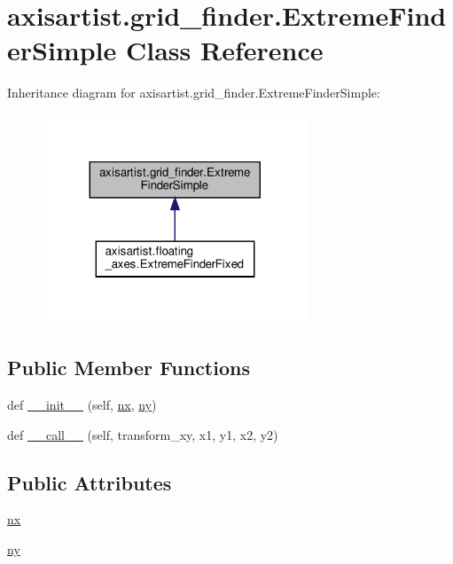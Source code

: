 \hypertarget{classaxisartist_1_1grid__finder_1_1ExtremeFinderSimple}{}\section{axisartist.\+grid\+\_\+finder.\+Extreme\+Finder\+Simple Class Reference}
\label{classaxisartist_1_1grid__finder_1_1ExtremeFinderSimple}


Inheritance diagram for axisartist.\+grid\+\_\+finder.\+Extreme\+Finder\+Simple\+:
\nopagebreak
\begin{figure}[H]
\begin{center}
\leavevmode
\includegraphics[width=224pt]{classaxisartist_1_1grid__finder_1_1ExtremeFinderSimple__inherit__graph}
\end{center}
\end{figure}
\subsection*{Public Member Functions}
\begin{DoxyCompactItemize}
\item 
def \hyperlink{classaxisartist_1_1grid__finder_1_1ExtremeFinderSimple_a16c044e3ab5bf91a03829658dd359147}{\+\_\+\+\_\+init\+\_\+\+\_\+} (self, \hyperlink{classaxisartist_1_1grid__finder_1_1ExtremeFinderSimple_a21a6f0268aaa5ad8b14f0b9d153c5609}{nx}, \hyperlink{classaxisartist_1_1grid__finder_1_1ExtremeFinderSimple_a12a07cc0177a1e2cb1aa0dbbc3ef161f}{ny})
\item 
def \hyperlink{classaxisartist_1_1grid__finder_1_1ExtremeFinderSimple_a42ea4610054cd0c98d449e3cc948912d}{\+\_\+\+\_\+call\+\_\+\+\_\+} (self, transform\+\_\+xy, x1, y1, x2, y2)
\end{DoxyCompactItemize}
\subsection*{Public Attributes}
\begin{DoxyCompactItemize}
\item 
\hyperlink{classaxisartist_1_1grid__finder_1_1ExtremeFinderSimple_a21a6f0268aaa5ad8b14f0b9d153c5609}{nx}
\item 
\hyperlink{classaxisartist_1_1grid__finder_1_1ExtremeFinderSimple_a12a07cc0177a1e2cb1aa0dbbc3ef161f}{ny}
\end{DoxyCompactItemize}


